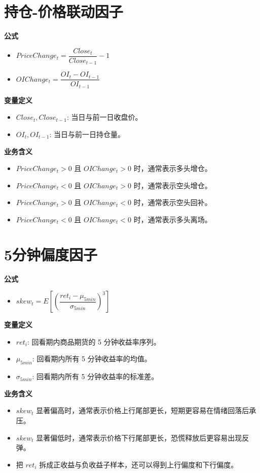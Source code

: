 \documentclass[11pt,a4paper]{ctexart}
\begin{document}
\section*{持仓-价格联动因子}
\textbf{公式}
\begin{itemize}
\item $PriceChange_t=\dfrac{Close_t}{Close_{t-1}}-1$
\item $OIChange_t=\dfrac{OI_t-OI_{t-1}}{OI_{t-1}}$
\end{itemize}
\textbf{变量定义}
\begin{itemize}
\item $Close_t, Close_{t-1}$: 当日与前一日收盘价。
\item $OI_t, OI_{t-1}$: 当日与前一日持仓量。
\end{itemize}
\textbf{业务含义}
\begin{itemize}
\item $PriceChange_t>0$ 且 $OIChange_t>0$ 时，通常表示多头增仓。
\item $PriceChange_t<0$ 且 $OIChange_t>0$ 时，通常表示空头增仓。
\item $PriceChange_t>0$ 且 $OIChange_t<0$ 时，通常表示空头回补。
\item $PriceChange_t<0$ 且 $OIChange_t<0$ 时，通常表示多头离场。
\end{itemize}

\section*{5分钟偏度因子}
\textbf{公式}
\begin{itemize}
\item $skew_t=E\left[\left(\dfrac{ret_i-\mu_{5min}}{\sigma_{5min}}\right)^3\right]$
\end{itemize}
\textbf{变量定义}
\begin{itemize}
\item $ret_i$: 回看期内商品期货的 5 分钟收益率序列。
\item $\mu_{5min}$: 回看期内所有 5 分钟收益率的均值。
\item $\sigma_{5min}$: 回看期内所有 5 分钟收益率的标准差。
\end{itemize}
\textbf{业务含义}
\begin{itemize}
\item $skew_t$ 显著偏高时，通常表示价格上行尾部更长，短期更容易在情绪回落后承压。
\item $skew_t$ 显著偏低时，通常表示价格下行尾部更长，恐慌释放后更容易出现反弹。
\item 把 $ret_i$ 拆成正收益与负收益子样本，还可以得到上行偏度和下行偏度。
\end{itemize}
\end{document}
